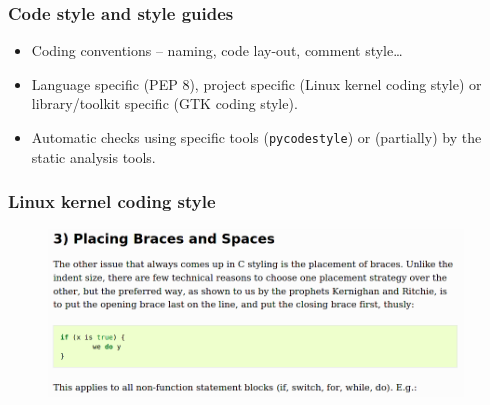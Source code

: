 \documentclass[aspectratio=169]{beamer}
\begin{document}
\begin{frame}
	\frametitle{Code style and style guides}

	\begin{block}{}
		\begin{itemize}
			\item Coding conventions -- naming, code lay-out, comment style…
			\item Language specific (PEP 8\footnotemark), project specific (Linux kernel coding style\footnotemark) or library/toolkit specific (GTK coding style\footnotemark).
			\item Automatic checks using specific tools (\texttt{pycodestyle}) or (partially) by the static analysis tools.
		\end{itemize}
	\end{block}

\end{frame}

\begin{frame}
	\frametitle{Linux kernel coding style}

\begin{center}
	
	\begin{figure}[ht!]
	\begin{center}
  	  \includegraphics[width=11cm]{img/kernel-coding-styles-1.png}
	\end{center}
	\end{figure}
\end{center}
\end{frame}
\end{document}
